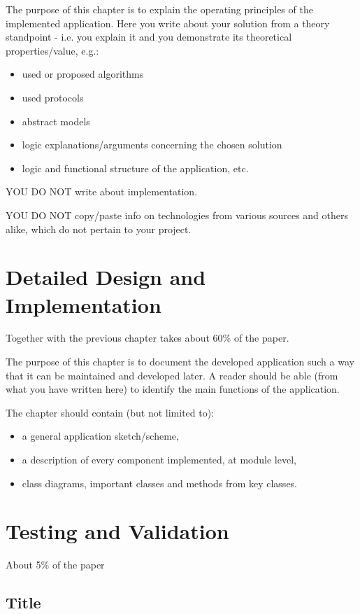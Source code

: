 \documentclass[12pt,a4paper,twoside]{report}
\begin{document}
The purpose of this chapter is to explain the operating principles of the implemented application.
Here you write about your solution from a theory standpoint - i.e. you explain it and you demonstrate its theoretical properties/value, e.g.:
\begin{itemize}
 \item used or proposed algorithms
 \item used protocols
 \item abstract models
 \item logic explanations/arguments concerning the chosen solution
 \item logic and functional structure of the application, etc.
\end{itemize}

{\color{red} YOU DO NOT write about implementation.

YOU DO NOT copy/paste info on technologies from various sources and others alike, which do not pertain to your project.
}

\chapter{Detailed Design and Implementation}

Together with the previous chapter takes about 60\% of the paper.

The purpose of this chapter is to document the developed application such a way that it can be maintained and developed later. A reader should be able (from what you have written here) to identify the main functions of the application.

The chapter should contain (but not limited to):
\begin{itemize}
 \item a general application sketch/scheme,
\item a description of every component implemented, at module level,
\item class diagrams, important classes and methods from key classes.
\end{itemize}

\chapter{Testing and Validation}

About 5\% of the paper
\section{Title}
\end{document}
